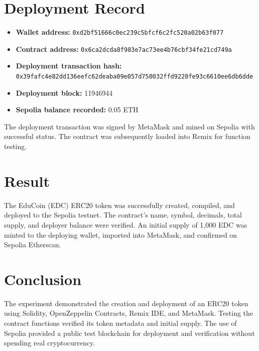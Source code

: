 \documentclass[12pt,a4paper]{article}
\begin{document}
\section{Deployment Record}
\begin{itemize}[leftmargin=1.5em]
\item \textbf{Wallet address:} \texttt{0xd2bf51666c0ec239c5bfcf6c2fc520a02b63f077}
\item \textbf{Contract address:} \texttt{0x6ca2dcda8f983e7ac73ee4b76cbf34fe21cd749a}
\item \textbf{Deployment transaction hash:} \texttt{0x39fafc4e82dd136eefc62deaba09e057d750032ffd9220fe93c6610ee6db6dde}
\item \textbf{Deployment block:} 11946944
\item \textbf{Sepolia balance recorded:} 0.05 ETH
\end{itemize}
The deployment transaction was signed by MetaMask and mined on Sepolia with successful status. The contract was subsequently loaded into Remix for function testing.

\section{Result}
The EduCoin (EDC) ERC20 token was successfully created, compiled, and deployed to the Sepolia testnet. The contract's name, symbol, decimals, total supply, and deployer balance were verified. An initial supply of 1,000 EDC was minted to the deploying wallet, imported into MetaMask, and confirmed on Sepolia Etherscan.

\section{Conclusion}
The experiment demonstrated the creation and deployment of an ERC20 token using Solidity, OpenZeppelin Contracts, Remix IDE, and MetaMask. Testing the contract functions verified its token metadata and initial supply. The use of Sepolia provided a public test blockchain for deployment and verification without spending real cryptocurrency.
\end{document}
